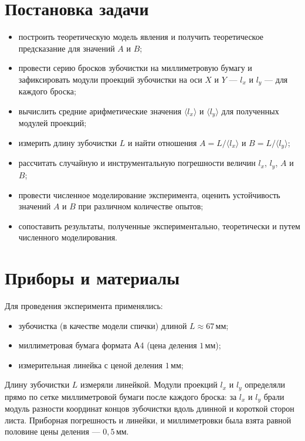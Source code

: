 \documentclass[a4paper, 14pt]{extarticle}
\begin{document}
\section*{Постановка задачи}

\begin{itemize}
  \item построить теоретическую модель явления и получить
    теоретическое предсказание для значений $A$ и $B$;
  \item провести серию бросков зубочистки
    на миллиметровую бумагу и зафиксировать модули проекций зубочистки
    на оси $X$ и $Y$ --- $l_x$ и $l_y$ --- для каждого броска;
  \item вычислить средние арифметические значения
    $\langle l_x \rangle$ и $\langle l_y \rangle$ для полученных модулей проекций;
  \item измерить длину зубочистки $L$ и найти отношения
    $A = L / \langle l_x \rangle$ и $B = L / \langle l_y \rangle$;
  \item рассчитать случайную и инструментальную
    погрешности величин $l_x$, $l_y$, $A$ и $B$;
  \item провести численное моделирование эксперимента, оценить
    устойчивость значений $A$ и $B$ при различном количестве опытов;
  \item сопоставить результаты, полученные экспериментально,
    теоретически и путем численного моделирования.
\end{itemize}

\section*{Приборы и материалы}

Для проведения эксперимента применялись:
\begin{itemize}
  \item зубочистка (в качестве модели спички) длиной $L \approx 67\,\text{мм}$;
  \item миллиметровая бумага формата А4 (цена деления $1\,\text{мм}$);
  \item измерительная линейка с ценой деления $1\,\text{мм}$;
\end{itemize}

Длину зубочистки $L$ измеряли линейкой. Модули проекций $l_x$ и $l_y$
определяли прямо по сетке миллиметровой бумаги после каждого броска: за
$l_x$ и $l_y$ брали модуль разности координат концов зубочистки вдоль
длинной и короткой сторон листа. Приборная погрешность и линейки,
и миллиметровки была взята равной половине цены деления --- $0{,}5\,\text{мм}$.
\end{document}
